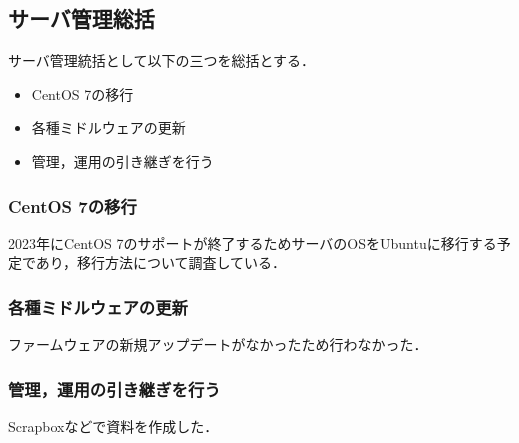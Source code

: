 \subsection*{サーバ管理総括}


サーバ管理統括として以下の三つを総括とする．
\begin{itemize}
    \item CentOS 7の移行
    \item 各種ミドルウェアの更新
    \item 管理，運用の引き継ぎを行う
\end{itemize}

\subsubsection*{CentOS 7の移行}
2023年にCentOS 7のサポートが終了するためサーバのOSをUbuntuに移行する予定であり，移行方法について調査している．

\subsubsection*{各種ミドルウェアの更新}
ファームウェアの新規アップデートがなかったため行わなかった．

\subsubsection*{管理，運用の引き継ぎを行う}
Scrapboxなどで資料を作成した．

